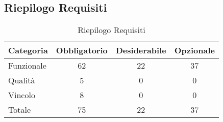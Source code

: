 \subsection{Riepilogo Requisiti}{ 
\renewcommand*{\arraystretch}{1.4} 
\begin{table}[h] 
 \begin{center} 
\begin{tabular}[c]{| p{2.5cm} | c | c | c |}  
\hline \textbf{Categoria} & \textbf{Obbligatorio} & \textbf{Desiderabile} & \textbf{Opzionale} \\ \hline 
Funzionale & 62 & 22 & 37\\ 
 \hline 
Qualità & 5 & 0 & 0\\ 
 \hline 
Vincolo & 8 & 0 & 0\\ 
 \hline 
Totale & 75 & 22 & 37\\ 
 \hline 
\end{tabular} 
 \caption{Riepilogo Requisiti\label{tab:riepilogo}}\end{center} 
 \end{table}}